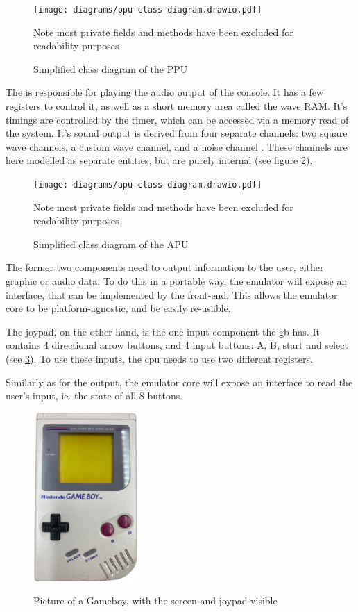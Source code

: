 \documentclass[11pt]{informatics-report}
\begin{document}
\begin{figure}[h]
    \centering
    \texttt{[image: diagrams/ppu-class-diagram.drawio.pdf]}
    \caption{Simplified class diagram of the PPU}
    Note most private fields and methods have been excluded for readability purposes
    \label{fig:ppu-class-diagram}
\end{figure}

The  is responsible for playing the audio output of the console. It has a few registers to control it, as well as a short memory area called the wave RAM. It's timings are controlled by the timer, which can be accessed via a memory read of the system. It's sound output is derived from four separate channels: two square wave channels, a custom wave channel, and a noise channel \cite[Audio]{pandoc}. These channels are here modelled as separate entities, but are purely internal (see figure \ref{fig:apu-class-diagram}).

\begin{figure}[h]
    \centering
    \texttt{[image: diagrams/apu-class-diagram.drawio.pdf]}
    \caption{Simplified class diagram of the APU}
    Note most private fields and methods have been excluded for readability purposes
    \label{fig:apu-class-diagram}
\end{figure}


The former two components need to output information to the user, either graphic or audio data. To do this in a portable way, the emulator will expose an interface, that can be implemented by the front-end. This allows the emulator core to be platform-agnostic, and be easily re-usable.

The joypad, on the other hand, is the one input component the \gls{gb} has. It contains 4 directional arrow buttons, and 4 input buttons: A, B, start and select (see \ref{fig:gb-front}). To use these inputs, the \gls{cpu} needs to use two different registers.

Similarly as for the output, the emulator core will expose an interface to read  the user's input, ie. the state of all 8 buttons.

\begin{figure}[h]
    \centering
    \includegraphics[width=4cm]{images/gameboy}\\
    \caption{Picture of a Gameboy, with the screen and joypad visible}
    \label{fig:gb-front}
\end{figure}
\end{document}
